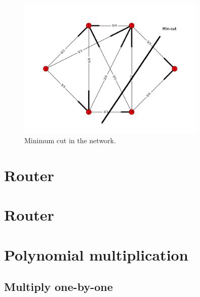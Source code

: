 \documentclass[a4paper,12px]{article}
\begin{document}
\begin{figure}[H]
    \includegraphics[width=0.8\textwidth]{figure1c.png}
    \caption{Minimum cut in the network.}
\end{figure}

\section{Router}
\section{Router}
\section{Polynomial multiplication}
\subsection{Multiply one-by-one}





%


%
%
\end{document}
